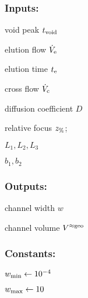 \subsubsection*{Inputs:}
\begin{multicols}{3}
  \begin{packed_item}
    \item void peak $t_\text{void}$
    \item elution flow $\dot{V}_\text{e}$
    \item elution time $t_\text{e}$
    \item cross flow $\dot{V}_\text{c}$
    \item \small diffusion coefficient \normalsize $D$
    \item relative focus $z_\text{\%}$;
    \item $L_1, L_2, L_3$
    \item $b_1, b_2$
  \end{packed_item}
\end{multicols}

\subsubsection*{Outputs:}
\begin{multicols}{3}
  \begin{packed_item}
    \item channel width $w$
    \item channel volume $V^{\approx\text{geo}}$
  \end{packed_item}
\end{multicols}

\subsubsection*{Constants:}
\begin{multicols}{3}
  \begin{packed_item}
    \item $w_\text{min} \leftarrow 10^{-4}$
    \item  $w_\text{max} \leftarrow 10$
  \end{packed_item}
\end{multicols}

